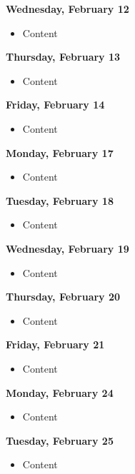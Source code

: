 \documentclass{article}
\begin{document}
\textbf{Wednesday, February 12}

\begin{itemize}
\item Content
\end{itemize}

\textbf{Thursday, February 13}

\begin{itemize}
\item Content
\end{itemize}

\textbf{Friday, February 14}

\begin{itemize}
\item Content
\end{itemize}

\textbf{Monday, February 17}

\begin{itemize}
\item Content
\end{itemize}

\textbf{Tuesday, February 18}

\begin{itemize}
\item Content
\end{itemize}

\textbf{Wednesday, February 19}

\begin{itemize}
\item Content
\end{itemize}

\textbf{Thursday, February 20}

\begin{itemize}
\item Content
\end{itemize}

\textbf{Friday, February 21}

\begin{itemize}
\item Content
\end{itemize}

\textbf{Monday, February 24}

\begin{itemize}
\item Content
\end{itemize}

\textbf{Tuesday, February 25}

\begin{itemize}
\item Content
\end{itemize}
\end{document}
